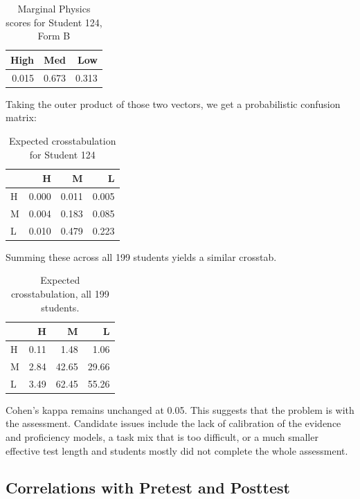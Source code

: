 \documentclass[]{article}
\begin{document}
\begin{table}

\caption{\label{tab:FormAB124}Marginal Physics scores for Student 124, Form B}
\centering
\begin{tabular}[t]{rrr}
\toprule
High & Med & Low\\
\midrule
0.015 & 0.673 & 0.313\\
\bottomrule
\end{tabular}
\end{table}

Taking the outer product of those two vectors, we get a probabilistic
confusion matrix:

\begin{table}

\caption{\label{tab:expAB124}Expected crosstabulation for Student 124}
\centering
\begin{tabular}[t]{lrrr}
\toprule
  & H & M & L\\
\midrule
H & 0.000 & 0.011 & 0.005\\
M & 0.004 & 0.183 & 0.085\\
L & 0.010 & 0.479 & 0.223\\
\bottomrule
\end{tabular}
\end{table}

Summing these across all 199 students yields a similar crosstab.

\begin{table}

\caption{\label{tab:ProbAB}Expected crosstabulation, all 199 students.}
\centering
\begin{tabular}[t]{lrrr}
\toprule
  & H & M & L\\
\midrule
H & 0.11 & 1.48 & 1.06\\
M & 2.84 & 42.65 & 29.66\\
L & 3.49 & 62.45 & 55.26\\
\bottomrule
\end{tabular}
\end{table}

Cohen's kappa remains unchanged at 0.05. This suggests that the problem
is with the assessment. Candidate issues include the lack of calibration
of the evidence and proficiency models, a task mix that is too
difficult, or a much smaller effective test length and students mostly
did not complete the whole assessment.

\subsection{Correlations with Pretest and
Posttest}\label{correlations-with-pretest-and-posttest}
\end{document}
